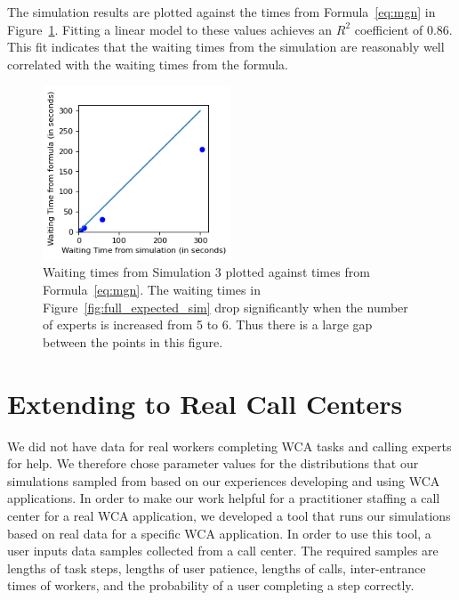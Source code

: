 The simulation results are plotted against the times from Formula~\ref{eq:mgn}
in Figure~\ref{fig:gof}.
Fitting a linear model to these values achieves an $R^2$ coefficient of 0.86.
This fit indicates that the waiting times from the simulation are reasonably
well correlated with the waiting times from the formula.

\begin{figure}[H]
  \includegraphics[width=0.5\textwidth]{figures/montecarlo/gof.png}
  \caption[
  Waiting times from Simulation 3 plotted against times from
  Formula~\ref{eq:mgn}
  ]{
    Waiting times from Simulation 3 plotted against times from
    Formula~\ref{eq:mgn}.
    The waiting times in Figure~\ref{fig:full_expected_sim} drop significantly
    when the number of experts is increased from 5 to 6.
    Thus there is a large gap between the points in this figure.
  }\label{fig:gof}
\end{figure}

\section{Extending to Real Call Centers}

We did not have data for real workers completing WCA tasks and calling experts
for help.
We therefore chose parameter values for the distributions that our simulations
sampled from based on our experiences developing and using WCA applications.
In order to make our work helpful for a practitioner staffing a call center for
a real WCA application, we developed a tool that runs our simulations based on
real data for a specific WCA application.
In order to use this tool, a user inputs data samples collected from a call
center.
The required samples are lengths of task steps, lengths of user patience,
lengths of calls, inter-entrance times of workers, and the probability of a user
completing a step correctly.


